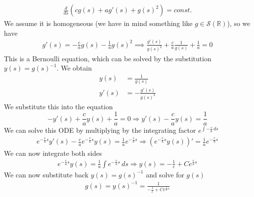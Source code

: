 \begin{enumerate}
\[\begin{split}
            \frac{d}{ds} \left(cg(s) + a g'(s) + g(s)^2\right) = const.
        \end{split}
    \]
    We assume it is homogeneous (we have in mind something like \(g\in \mathcal{S}(\mathbb{R})\)), so we have
    \[
        \begin{split}
            g'(s) =- \frac{c}{a} g(s)  -\frac{1}{a} g(s)^2  \implies \frac{g'(s)}{g(s)^2} + \frac{c}{a} \frac{1}{g(s)} + \frac{1}{a} = 0
        \end{split}
    \]
    This is a Bernoulli equation, which can be solved by the substitution \(y(s) = g(s)^{-1}\). We obtain
    \[
    \begin{split}
        y(s) &= \frac{1}{g(s)}\\ 
        y'(s) &= -\frac{g'(s)}{g(s)^2} 
    \end{split}
    \]
    We substitute this into the equation
    \[
        -y'(s) + \frac{c}{a} y(s) + \frac{1}{a} = 0 \Rightarrow y'(s) - \frac{c}{a} y(s) = \frac{1}{a}
    \]
    We can solve this ODE by multiplying by the integrating factor \(e^{\int -\frac{c}{a} \, ds}\)
    \[
        \begin{split}
            e^{-\frac{c}{a}s} y'(s) - \frac{c}{a} e^{-\frac{c}{a}s} y(s) = \frac{1}{a} e^{-\frac{c}{a}s} \Rightarrow \left(e^{-\frac{c}{a}s} y(s)\right)' = \frac{1}{a} e^{-\frac{c}{a}s}
        \end{split}
    \]
    We can now integrate both sides
    \[
        \begin{split}
            e^{-\frac{c}{a}s} y(s) = \frac{1}{a} \int e^{-\frac{c}{a}s} \, ds \Rightarrow y(s) = -\frac{1}{c} + C e^{\frac{c}{a}s}
        \end{split}
    \]
    We can now substitute back \(y(s) = g(s)^{-1}\) and solve for \(g(s)\)
    \[
        \begin{split}
            g(s) = y(s)^{-1} = \frac{1}{-\frac{1}{c} + C e^{\frac{c}{a}s}}
        \end{split}
    \]
\end{enumerate}

\newpage

